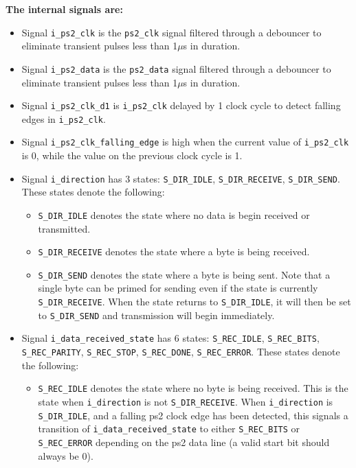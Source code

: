\documentclass{article}
\begin{document}
{\bf The internal signals are:}
\begin{itemize}
\item Signal \texttt{i\_ps2\_clk} is the \texttt{ps2\_clk} signal filtered through a debouncer to eliminate transient pulses less than 1\(\mu\)s in duration. 
\item Signal \texttt{i\_ps2\_data} is the \texttt{ps2\_data} signal filtered through a debouncer to eliminate transient pulses less than 1\(\mu\)s in duration. 
\item Signal \texttt{i\_ps2\_clk\_d1} is \texttt{i\_ps2\_clk} delayed by 1 clock cycle to detect falling edges in \texttt{i\_ps2\_clk}. 
\item Signal \texttt{i\_ps2\_clk\_falling\_edge} is high when the current value of \texttt{i\_ps2\_clk} is 0, while the value on the previous clock cycle is 1. 
\item Signal \texttt{i\_direction} has 3 states: \texttt{S\_DIR\_IDLE}, \texttt{S\_DIR\_RECEIVE}, \texttt{S\_DIR\_SEND}. These states denote the following: 
	\begin{itemize}
	\item \texttt{S\_DIR\_IDLE} denotes the state where no data is begin received or transmitted.  
	\item \texttt{S\_DIR\_RECEIVE} denotes the state where a byte is being received. 
	\item \texttt{S\_DIR\_SEND} denotes the state where a byte is being sent. Note that a single byte can be primed for sending even if the state is currently \texttt{S\_DIR\_RECEIVE}. When the state returns to \texttt{S\_DIR\_IDLE}, it will then be set to \texttt{S\_DIR\_SEND} and transmission will begin immediately.    
	\end{itemize} 
\item Signal \texttt{i\_data\_received\_state} has 6 states: \texttt{S\_REC\_IDLE}, \texttt{S\_REC\_BITS}, \texttt{S\_REC\_PARITY}, \texttt{S\_REC\_STOP}, \texttt{S\_REC\_DONE}, \texttt{S\_REC\_ERROR}. These states denote the following: 
	\begin{itemize}
	\item \texttt{S\_REC\_IDLE} denotes the state where no byte is being received. This is the state when \texttt{i\_direction} is not \texttt{S\_DIR\_RECEIVE}. When \texttt{i\_direction} is \texttt{S\_DIR\_IDLE}, and a falling ps2 clock edge has been detected, this signals a transition of \texttt{i\_data\_received\_state} to either \texttt{S\_REC\_BITS} or \texttt{S\_REC\_ERROR} depending on the ps2 data line (a valid start bit should always be 0).

\end{itemize}
\end{itemize}
\end{document}
